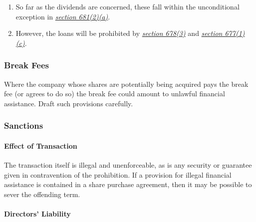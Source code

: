 \documentclass[
]{article}
\providecommand{\tightlist}{%
  \setlength{\itemsep}{0pt}\setlength{\parskip}{0pt}}
\begin{document}
\begin{enumerate}
  \begin{enumerate}
  \def\labelenumii{\arabic{enumii}.}
  \tightlist
  \item
    So far as the dividends are concerned, these fall within the
    unconditional exception in
    \emph{\href{https://uk.westlaw.com/8-506-2055?originationContext=document\&transitionType=PLDocumentLink\&contextData=(sc.Default)\&ppcid=fc9f4d9e83af4b4c8d47bf5847a3205c}{section
    681(2)(a)}}.
  \item
    However, the loans will be prohibited by
    \emph{\href{https://uk.westlaw.com/5-505-7258?originationContext=document\&transitionType=PLDocumentLink\&contextData=(sc.Default)\&ppcid=fc9f4d9e83af4b4c8d47bf5847a3205c}{section
    678(3)}} and
    \emph{\href{https://uk.westlaw.com/8-505-7474?originationContext=document\&transitionType=PLDocumentLink\&contextData=(sc.Default)\&ppcid=fc9f4d9e83af4b4c8d47bf5847a3205c}{section
    677(1)(c)}}.
  \end{enumerate}
\end{enumerate}

\hypertarget{break-fees}{%
\subsubsection{Break Fees}\label{break-fees}}

Where the company whose shares are potentially being acquired pays the
break fee (or agrees to do so) the break fee could amount to unlawful
financial assistance. Draft such provisions carefully.

\hypertarget{sanctions}{%
\subsubsection{Sanctions}\label{sanctions}}

\hypertarget{effect-of-transaction}{%
\paragraph{Effect of Transaction}\label{effect-of-transaction}}

The transaction itself is illegal and unenforceable, as is any security
or guarantee given in contravention of the prohibition. If a provision
for illegal financial assistance is contained in a share purchase
agreement, then it may be possible to sever the offending term.

\hypertarget{directors-liability}{%
\paragraph{Directors' Liability}\label{directors-liability}}
\end{document}
